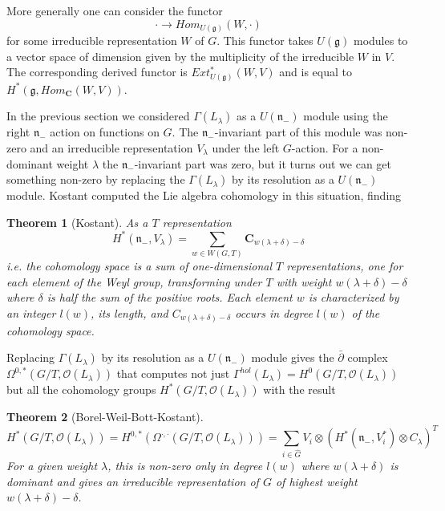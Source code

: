 \documentclass[a4paper,a4paper]{article}
\newtheorem{theorem}{Theorem}
\theoremstyle{conjecture}
\begin{document}
More generally one can consider the functor
$$\cdot\longrightarrow Hom_{U(\mathfrak g)}(W,\cdot)$$
for some irreducible representation $W$ of $G$. This functor takes $U(\mathfrak g)$
modules to a vector space of dimension given by the multiplicity of the irreducible
$W$ in $V$.  The corresponding derived functor is
$Ext^*_{U(\mathfrak g)}(W,V)$ and is equal to
$H^*(\mathfrak g, Hom_{\mathbf C}(W,V))$.

In the previous section we considered $\Gamma (L_\lambda)$ as a $U(\mathfrak n_-)$
module using the right $\mathfrak n_-$ action on functions on $G$.  The
$\mathfrak n_-$-invariant part of this module was non-zero and an irreducible
representation $V_\lambda$ under the left $G$-action.  For a non-dominant
weight $\lambda$ the $\mathfrak n_-$-invariant part was zero, but it turns out
we can get something non-zero by replacing the  $\Gamma (L_\lambda)$ by its
resolution as a $U(\mathfrak n_-)$ module.  Kostant computed the Lie algebra
cohomology in this situation, finding \cite{Kostant1}
\begin{theorem}[Kostant]

As a $T$ representation
$$H^*(\mathfrak n_-,V_\lambda)=\sum_{w\in W(G,T)} \mathbf C_{w(\lambda+\delta)-\delta}$$
i.e. the cohomology space is a sum of one-dimensional $T$ representations, one for each
element of the Weyl group, transforming under $T$ with weight $w(\lambda+\delta)-\delta$ where
$\delta$ is half the sum of the positive roots.  Each element $w$ is characterized by
an integer $l(w)$, its length, and $ C_{w(\lambda+\delta)-\delta}$ occurs in degree
$l(w)$ of the cohomology space.
\end{theorem}

Replacing  $\Gamma (L_\lambda)$ by its resolution as a $U(\mathfrak n_-)$ module gives the
$\bar\partial$ complex $\Omega^{0,*}(G/T,{\mathcal O}(L_\lambda))$ that computes not just
$\Gamma^{hol}(L_\lambda)=H^0(G/T,{\mathcal
O}(L_\lambda))$ but all the cohomology groups $H^*(G/T,{\mathcal O}(L_\lambda))$ with the
result

\begin{theorem}[Borel-Weil-Bott-Kostant]

$$H^*(G/T, {\mathcal O}(L_\lambda))=H^{0,*}(\Omega^{\cdot,\cdot}(G/T,{\mathcal O}(L_\lambda)))
=\sum_{i\in \hat G}V_i\otimes (H^*({\mathfrak n_-},V_i^*)\otimes C_\lambda)^T$$
For a given weight $\lambda$, this is non-zero only in degree $l(w)$ where $w(\lambda+\delta)$
is dominant and gives an irreducible representation of $G$ of highest weight $w(\lambda +\delta)
-\delta$.
\end{theorem}
\end{document}
